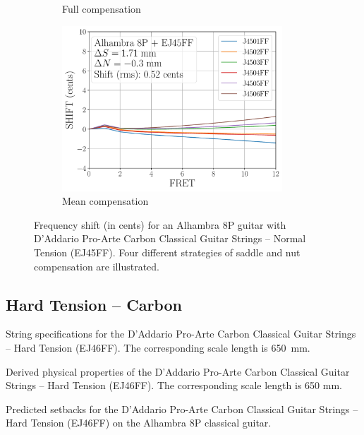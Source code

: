 \begin{figure}
\begin{subfigure}[b]{0.46\textwidth}
    \caption{Full compensation}
    \label{fig:shift_alhambra8p_ej45ff_full}
   \end{subfigure}
   \hspace{0.25in}
   \begin{subfigure}[b]{0.46\textwidth}
    \centering
    \includegraphics[width=3.25in]{../figures/shift_alhambra8p_ej45ff_mean}
    \caption{Mean compensation}
    \label{fig:shift_alhambra8p_ej45ff_mean}
   \end{subfigure}
   \caption{\label{fig:compensation_alhambra8p_ej45ff} Frequency shift (in cents) for an Alhambra 8P guitar with D'Addario Pro-Arte Carbon Classical Guitar Strings -- Normal Tension (EJ45FF). Four different strategies of saddle and nut compensation are illustrated.}
 \end{figure}
 
 \newpage
 \subsection{Hard Tension -- Carbon}
 
 \begin{table}[htbp]
   \centering
   \caption{\label{tbl:ej46ff_mks} String specifications for the D'Addario Pro-Arte Carbon Classical Guitar Strings -- Hard Tension (EJ46FF). The corresponding scale length is 650~mm.}
   
 \end{table}%
 
 \begin{table}[htbp]
   \centering
   \caption{\label{tbl:ej46ff_props} Derived physical properties of the D'Addario Pro-Arte Carbon Classical Guitar Strings -- Hard Tension (EJ46FF). The corresponding scale length is 650 mm.}
   
 \end{table}%
 
 \begin{table}[htbp]
   \centering
   \caption{\label{tbl:ej46ff_setbacks} Predicted setbacks for the D'Addario Pro-Arte Carbon Classical Guitar Strings -- Hard Tension (EJ46FF) on the Alhambra 8P classical guitar.}
   
 \end{table}%
 
